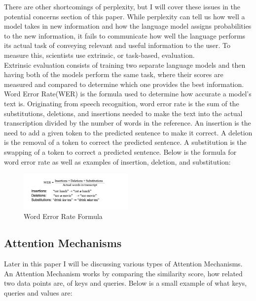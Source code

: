 \documentclass[10pt,twocolumn]{article}
\begin{document}
There are other shortcomings of perplexity, but I will cover these issues in the potential concerns section of this paper. While perplexity can tell us how well a model takes in new information and how the language model assigns probabilities to the new information, it fails to communicate how well the language performs its actual task of conveying relevant and useful information to the user. To measure this, scientists use extrinsic, or task-based, evaluation.\\ \indent Extrinsic evaluation consists of training two separate language models and then having both of the models perform the same task, where their scores are measured and compared to determine which one provides the best information. Word Error Rate(WER) is the formula used to determine how accurate a model's text is. Originating from speech recognition, word error rate is the sum of the substitutions, deletions, and insertions needed to make the text into the actual transcription divided by the number of words in the reference. An insertion is the need to add a given token to the predicted sentence to make it correct. A deletion is the removal of a token to correct the predicted sentence. A substitution is the swapping of a token to correct a predicted sentence. Below is the formula for word error rate as well as examples of insertion, deletion, and substitution:

\begin{figure}[h]
    \centering
    \includegraphics[width=0.5\textwidth]{Images/WER.png}
    \caption{Word Error Rate Formula}
    \label{fig:example_image}
\end{figure}

\subsection{Attention Mechanisms}
Later in this paper I will be discussing various types of Attention Mechanisms\cite{american_express_comprehensive_2019}. An Attention Mechanism works by comparing the similarity score, how related two data points are, of keys and queries. Below is a small example of what keys, queries and values are:\\ 
\end{document}
